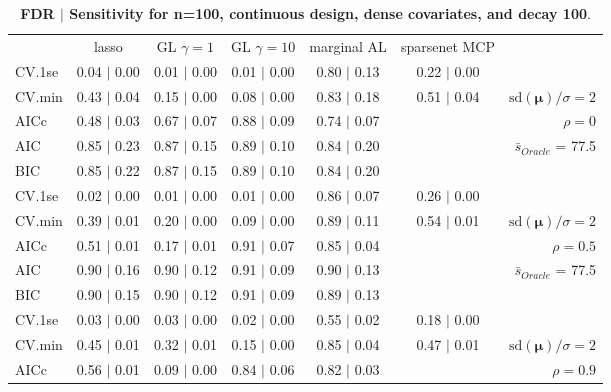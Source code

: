 \begin{table}\vspace{-.5cm}
\caption[l]{ {\it }
{ \bf FDR $\boldsymbol{\mid}$ Sensitivity for n=100, continuous design, dense covariates, and  decay  100}.}
\vspace{-.5cm}
\footnotesize{}
\begin{center}
\begin{tabular}{l*{5}{c}|r}
 & lasso & GL $\gamma=1$ & GL $\gamma=10$ & marginal AL & sparsenet MCP  & \\
 \cline{1-7}
CV.1se & 0.04 $\mid$ 0.00 & 0.01 $\mid$ 0.00 & 0.01 $\mid$ 0.00 & 0.80 $\mid$ 0.13 & 0.22 $\mid$ 0.00 & \\
CV.min & 0.43 $\mid$ 0.04 & 0.15 $\mid$ 0.00 & 0.08 $\mid$ 0.00 & 0.83 $\mid$ 0.18 & 0.51 $\mid$ 0.04 &  $\mathrm{sd}(\mathbf{\mu})/\sigma=2$ \\
AICc & 0.48 $\mid$ 0.03 & 0.67 $\mid$ 0.07 & 0.88 $\mid$ 0.09 & 0.74 $\mid$ 0.07 & & $\rho=0$ \\
AIC & 0.85 $\mid$ 0.23 & 0.87 $\mid$ 0.15 & 0.89 $\mid$ 0.10 & 0.84 $\mid$ 0.20 & &  \multirow{2}{*}{$\bar{s}_{Oracle}$ = 77.5} \\
BIC & 0.85 $\mid$ 0.22 & 0.87 $\mid$ 0.15 & 0.89 $\mid$ 0.10 & 0.84 $\mid$ 0.20 & &  \\
 \hline 
CV.1se & 0.02 $\mid$ 0.00 & 0.01 $\mid$ 0.00 & 0.01 $\mid$ 0.00 & 0.86 $\mid$ 0.07 & 0.26 $\mid$ 0.00 & \\
CV.min & 0.39 $\mid$ 0.01 & 0.20 $\mid$ 0.00 & 0.09 $\mid$ 0.00 & 0.89 $\mid$ 0.11 & 0.54 $\mid$ 0.01 &  $\mathrm{sd}(\mathbf{\mu})/\sigma=2$ \\
AICc & 0.51 $\mid$ 0.01 & 0.17 $\mid$ 0.01 & 0.91 $\mid$ 0.07 & 0.85 $\mid$ 0.04 & & $\rho=0.5$ \\
AIC & 0.90 $\mid$ 0.16 & 0.90 $\mid$ 0.12 & 0.91 $\mid$ 0.09 & 0.90 $\mid$ 0.13 & &  \multirow{2}{*}{$\bar{s}_{Oracle}$ = 77.5} \\
BIC & 0.90 $\mid$ 0.15 & 0.90 $\mid$ 0.12 & 0.91 $\mid$ 0.09 & 0.89 $\mid$ 0.13 & &  \\
 \hline 
CV.1se & 0.03 $\mid$ 0.00 & 0.03 $\mid$ 0.00 & 0.02 $\mid$ 0.00 & 0.55 $\mid$ 0.02 & 0.18 $\mid$ 0.00 & \\
CV.min & 0.45 $\mid$ 0.01 & 0.32 $\mid$ 0.01 & 0.15 $\mid$ 0.00 & 0.85 $\mid$ 0.04 & 0.47 $\mid$ 0.01 &  $\mathrm{sd}(\mathbf{\mu})/\sigma=2$ \\
AICc & 0.56 $\mid$ 0.01 & 0.09 $\mid$ 0.00 & 0.84 $\mid$ 0.06 & 0.82 $\mid$ 0.03 & & $\rho=0.9$ \\

\end{tabular}
\end{center}
\end{table}
